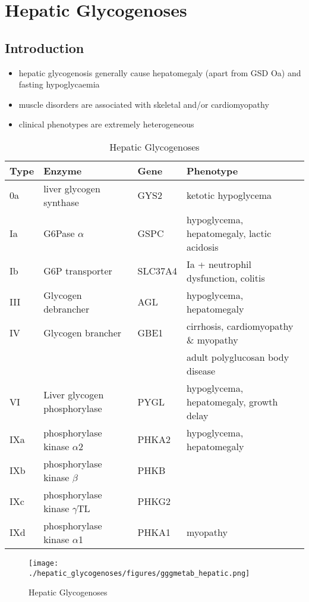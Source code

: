 \documentclass{scrartcl}
\begin{document}
\section{Hepatic Glycogenoses}
\label{sec:org4b411c4}
\subsection{Introduction}
\label{sec:org8714c3a}
\begin{itemize}
\item hepatic glycogenosis generally cause hepatomegaly (apart from GSD
Oa) and fasting hypoglycaemia
\item muscle disorders are associated with skeletal and/or
cardiomyopathy
\item clinical phenotypes are extremely heterogeneous
\end{itemize}
\begin{table}[htbp]
\caption{\label{tab:org2c95338}
Hepatic Glycogenoses}
\centering
\begin{tabular}{llll}
Type & Enzyme & Gene & Phenotype\\
\hline
0a & liver glycogen synthase & GYS2 & ketotic hypoglycema\\
Ia & G6Pase \(\alpha\) & GSPC & hypoglycema, hepatomegaly, lactic acidosis\\
Ib & G6P transporter & SLC37A4 & Ia + neutrophil dysfunction, colitis\\
III & Glycogen debrancher & AGL & hypoglycema, hepatomegaly\\
IV & Glycogen brancher & GBE1 & cirrhosis, cardiomyopathy \& myopathy\\
 &  &  & adult polyglucosan body disease\\
VI & Liver glycogen phosphorylase & PYGL & hypoglycema, hepatomegaly, growth delay\\
IXa & phosphorylase kinase \(\alpha\)2 & PHKA2 & hypoglycema, hepatomegaly\\
IXb & phosphorylase kinase \(\beta\) & PHKB & \\
IXc & phosphorylase kinase \(\gamma\)TL & PHKG2 & \\
IXd & phosphorylase kinase \(\alpha\)1 & PHKA1 & myopathy\\
\end{tabular}
\end{table}

\begin{figure}[htbp]
\centering
\texttt{[image: ./hepatic\_glycogenoses/figures/gggmetab\_hepatic.png]}
\caption[Hepatic Glycogenoses]{\label{fig:org25da71b}
Hepatic Glycogenoses}
\end{figure}
\end{document}
